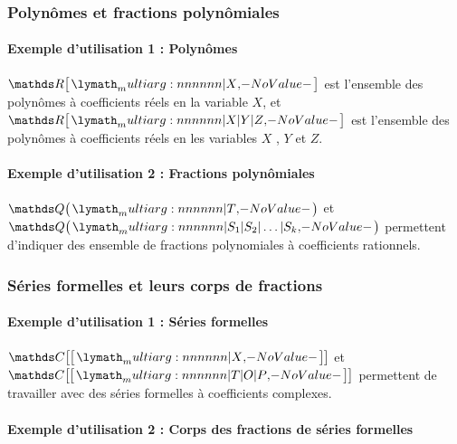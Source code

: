 \documentclass[12pt,a4paper]{article}
\theoremstyle{definition}
\begin{document}
\subsubsection{Polynômes et fractions polynômiales}

\paragraph{Exemple d'utilisation 1 : Polynômes}

\begin{tcblisting}{}
$\setpoly{\RR}{X}$ est l'ensemble des polynômes à coefficients réels en la variable
$X$, et $\setpoly{\RR}{X | Y | Z}$ est l'ensemble des polynômes à coefficients réels
en les variables $X$ , $Y$ et $Z$.
\end{tcblisting}



\paragraph{Exemple d'utilisation 2 : Fractions polynômiales}

\begin{tcblisting}{}
$\setpolyfrac{\QQ}{T}$ et $\setpolyfrac{\QQ}{S_1 | S_2 | \dots | S_k}$ permettent
d'indiquer des ensemble de fractions polynomiales à coefficients rationnels.
\end{tcblisting}



\subsubsection{Séries formelles et leurs corps de fractions}

\paragraph{Exemple d'utilisation 1 : Séries formelles}

\begin{tcblisting}{}
$\setserie{\CC}{X}$ et $\setserie{\CC}{T | O | P}$ permettent de travailler avec des
séries formelles à coefficients complexes.
\end{tcblisting}



\paragraph{Exemple d'utilisation 2 : Corps des fractions de séries formelles}
\end{document}
